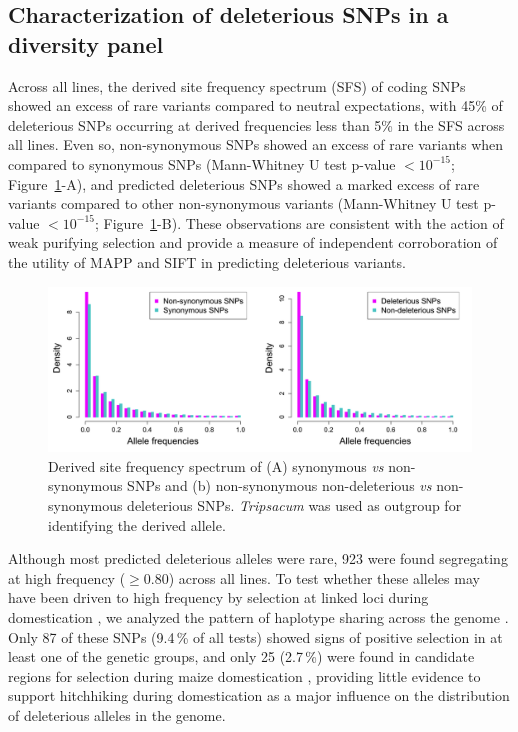 \documentclass[12pt]{article}
\begin{document}
\subsection*{Characterization of deleterious SNPs in a diversity panel}

Across all lines, the derived site frequency spectrum (SFS) of coding SNPs showed an excess of rare variants compared to neutral expectations, with 45\% of deleterious SNPs occurring at derived frequencies less than 5\% in the SFS across all lines. 
Even so, non-synonymous SNPs showed an excess of rare variants when compared to synonymous SNPs (Mann-Whitney U test p-value $<10^{-15}$; Figure~\ref{sfs_non_syn}-A), and predicted deleterious SNPs showed a marked excess of rare variants compared to other non-synonymous variants (Mann-Whitney U test p-value $<10^{-15}$; Figure~\ref{sfs_non_syn}-B). These observations are consistent with the action of weak purifying selection \citep{Cummings1998,Fay2001} and provide a measure of independent corroboration of the utility of MAPP and SIFT in predicting deleterious variants.

\begin{figure}[!b]
  \begin{center}
   \includegraphics[width=150mm]{SFS.png}
    \caption{Derived site frequency spectrum of (A) synonymous \emph{vs} non-synonymous SNPs and (b) non-synonymous non-deleterious \emph{vs} non-synonymous deleterious SNPs. \emph{Tripsacum} was used as outgroup for identifying the derived allele.} 
\label{sfs_non_syn}
  \end{center}
\end{figure}

Although most predicted deleterious alleles were rare, 923 were found segregating at high frequency ($\geq 0.80$) across all lines.  To test whether these alleles may have been driven to high frequency by selection at linked loci during domestication \citep{Lu2006}, we analyzed the pattern of haplotype sharing across the genome \citep[PHS statistics;][]{Toomajian2006}. Only 87 of these SNPs (9.4\,\% of all tests) showed signs of positive selection in at least one of the genetic groups, and only 25 (2.7\,\%) were found in candidate regions for selection during maize domestication \citep{Hufford2012}, providing little evidence to support hitchhiking during domestication as a major influence on the distribution of deleterious alleles in the genome.
\end{document}
